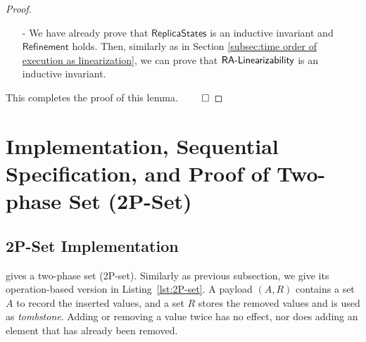 \begin {proof}
\begin{itemize}
\item[-] We have already prove that $\mathsf{ReplicaStates}$ is an inductive invariant and $\mathsf{Refinement}$ holds. Then, similarly as in Section \ref{subsec:time order of execution as linearization}, we can prove that $\mathsf{RA\text{-}Linearizability{}}$ is an inductive invariant.
\end{itemize}

This completes the proof of this lemma. $\qed$
\end {proof}








\section{Implementation, Sequential Specification, and Proof of Two-phase Set (2P-Set)}
\label{sec:implementation, sequential specification, and proof of two-phase set (2P-set)}


\subsection{2P-Set Implementation}
\label{subsec:2P-set implementation}

\cite{ShapiroPBZ11} gives a two-phase set (2P-set). Similarly as previous subsection, we give its operation-based version in Listing~\ref{lst:2P-set}. A payload $(A,R)$ contains a set $A$ to record the inserted values, and a set $R$ stores the removed values and is used as \emph{tombstone}. Adding or removing a value twice has no effect, nor does adding an element that has already been removed.


